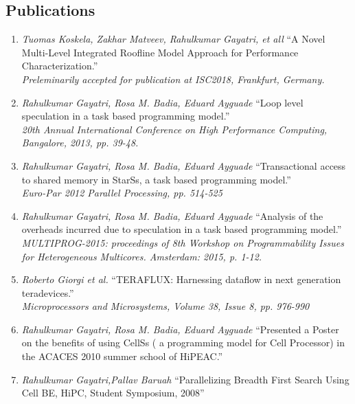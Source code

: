 \documentclass[margin]{res}
\begin{document}
\begin{resume}
\section{Publications}
%
\begin{enumerate}
	   \item \textit{Tuomas Koskela, Zakhar Matveev, Rahulkumar Gayatri, et all}
			 \enquote{A Novel Multi-Level Integrated Roofline Model Approach for Performance Characterization.} \\
             \textit{Preleminarily accepted for publication at ISC2018, Frankfurt, Germany. }
%
	   \item \textit{Rahulkumar Gayatri, Rosa M. Badia, Eduard Ayguade}
			 \enquote{Loop level speculation in a task based programming model.} \\
             \textit{20th Annual International Conference on High Performance Computing, Bangalore, 2013, pp. 39-48. }
%
	   \item \textit{Rahulkumar Gayatri, Rosa M. Badia, Eduard Ayguade}
			 \enquote{Transactional access to shared memory in StarSs, a task based programming model.} \\
             \textit{Euro-Par 2012 Parallel Processing, pp. 514-525}
%
	   \item \textit{Rahulkumar Gayatri, Rosa M. Badia, Eduard Ayguade}
			 \enquote{Analysis of the overheads incurred due to speculation in a task based programming model.} \\
             \textit{MULTIPROG-2015: proceedings of 8th Workshop on Programmability Issues for Heterogeneous Multicores. Amsterdam: 2015, p. 1-12.}
%
	   \item \textit{Roberto Giorgi et al.}
			 \enquote{TERAFLUX: Harnessing dataflow in next generation teradevices.} \\
             \textit{Microprocessors and Microsystems, Volume 38, Issue 8, pp. 976-990}
%
	   \item \textit{Rahulkumar Gayatri, Rosa M. Badia, Eduard Ayguade}
			 \enquote{Presented a Poster on the benefits of using CellSs ( a programming model for Cell Processor) in the ACACES 2010 summer school of HiPEAC.}
%
	   \item \textit{Rahulkumar Gayatri,Pallav Baruah} \enquote{Parallelizing Breadth First Search Using Cell BE, HiPC, Student Symposium, 2008}
%
\end {enumerate}
%

\end{resume}
\end{document}
